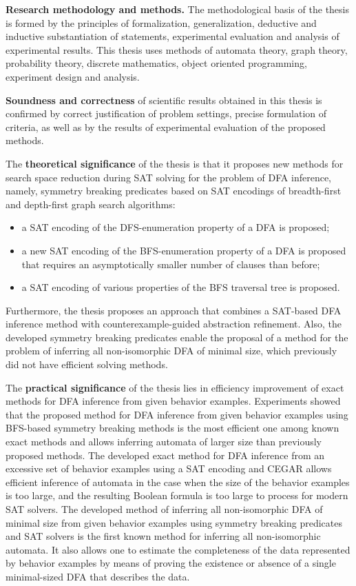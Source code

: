 \textbf{Research methodology and methods.} 
The methodological basis of the thesis is formed by the principles of formalization, generalization, deductive and inductive substantiation of statements, experimental evaluation and analysis of experimental results.
This thesis uses methods of automata theory, graph theory, probability theory, discrete mathematics, object oriented programming, experiment design and analysis.

\textbf{Soundness and correctness} of scientific results obtained in this thesis is confirmed by correct justification of problem settings, precise formulation of criteria,
as well as by the results of experimental evaluation of the proposed methods.

The \textbf{theoretical significance} of the thesis is that it proposes new methods for search space reduction during SAT solving for the problem of DFA inference, namely, symmetry breaking predicates based on SAT encodings of breadth-first and depth-first graph search algorithms:
\begin{itemize}
  \item a SAT encoding of the DFS-enumeration property of a DFA is proposed;
  \item a new SAT encoding of the BFS-enumeration property of a DFA is proposed that requires an asymptotically smaller number of clauses than before;
  \item a SAT encoding of various properties of the BFS traversal tree is proposed.
\end{itemize}
Furthermore, the thesis proposes an approach that combines a SAT-based DFA inference method with counterexample-guided abstraction refinement.
Also, the developed symmetry breaking predicates enable the proposal of a method for the problem of inferring all non-isomorphic DFA of minimal size, which previously did not have efficient solving methods.

The \textbf{practical significance} of the thesis lies in efficiency improvement of exact methods for DFA inference from given behavior examples.
Experiments showed that the proposed method for DFA inference from given behavior examples using BFS-based symmetry breaking methods
is the most efficient one among known exact methods and allows inferring automata of larger size than previously proposed methods.
The developed exact method for DFA inference from an excessive set of behavior examples using a SAT encoding and CEGAR allows efficient inference of automata in 
the case when the size of the behavior examples is too large, and the resulting Boolean formula is too large to process for modern SAT solvers.
The developed method of inferring all non-isomorphic DFA of minimal size from given behavior examples using symmetry breaking predicates and SAT solvers is the first known
method for inferring all non-isomorphic automata.
It also allows one to estimate the completeness of the data represented by behavior examples by means of proving the existence or absence of a single minimal-sized DFA that describes the data.

